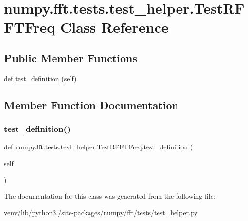 \hypertarget{classnumpy_1_1fft_1_1tests_1_1test__helper_1_1TestRFFTFreq}{}\section{numpy.\+fft.\+tests.\+test\+\_\+helper.\+Test\+R\+F\+F\+T\+Freq Class Reference}
\label{classnumpy_1_1fft_1_1tests_1_1test__helper_1_1TestRFFTFreq}
\subsection*{Public Member Functions}
\begin{DoxyCompactItemize}
\item 
def \hyperlink{classnumpy_1_1fft_1_1tests_1_1test__helper_1_1TestRFFTFreq_a545a6c7c2cc8fbf9199978397fe64d93}{test\+\_\+definition} (self)
\end{DoxyCompactItemize}


\subsection{Member Function Documentation}
\mbox{\label{classnumpy_1_1fft_1_1tests_1_1test__helper_1_1TestRFFTFreq_a545a6c7c2cc8fbf9199978397fe64d93}} 
\subsubsection{\texorpdfstring{test\+\_\+definition()}{test\_definition()}}
{\footnotesize\ttfamily def numpy.\+fft.\+tests.\+test\+\_\+helper.\+Test\+R\+F\+F\+T\+Freq.\+test\+\_\+definition (\begin{DoxyParamCaption}\item[{}]{self }\end{DoxyParamCaption})}



The documentation for this class was generated from the following file\+:\begin{DoxyCompactItemize}
\item 
venv/lib/python3./site-\/packages/numpy/fft/tests/\hyperlink{test__helper_8py}{test\+\_\+helper.\+py}\end{DoxyCompactItemize}
